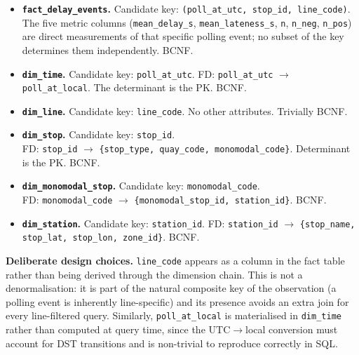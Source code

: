 \documentclass[a4paper,11pt]{article}
\begin{document}
\begin{itemize}
  \item \textbf{\texttt{fact\_delay\_events}.}
    Candidate key: \texttt{(poll\_at\_utc, stop\_id, line\_code)}.
    The five metric columns (\texttt{mean\_delay\_s}, \texttt{mean\_lateness\_s},
    \texttt{n}, \texttt{n\_neg}, \texttt{n\_pos}) are direct measurements of that
    specific polling event; no subset of the key determines them independently.
    BCNF. \\
  \item \textbf{\texttt{dim\_time}.}
    Candidate key: \texttt{poll\_at\_utc}.
    FD: \texttt{poll\_at\_utc} $\to$ \texttt{poll\_at\_local}.
    The determinant is the PK. BCNF. \\
  \item \textbf{\texttt{dim\_line}.}
    Candidate key: \texttt{line\_code}. No other attributes. Trivially BCNF. \\
  \item \textbf{\texttt{dim\_stop}.}
    Candidate key: \texttt{stop\_id}.\\
    FD: \texttt{stop\_id} $\to$ \texttt{\{stop\_type, quay\_code, monomodal\_code\}}.
    Determinant is the PK. BCNF. \\
  \item \textbf{\texttt{dim\_monomodal\_stop}.}
    Candidate key: \texttt{monomodal\_code}.\\
    FD: \texttt{monomodal\_code} $\to$ \texttt{\{monomodal\_stop\_id, station\_id\}}.
    BCNF. \\
  \item \textbf{\texttt{dim\_station}.}
    Candidate key: \texttt{station\_id}.
    FD: \texttt{station\_id} $\to$ \texttt{\{stop\_name, stop\_lat, stop\_lon,
    zone\_id\}}.
    BCNF.
\end{itemize}

\textbf{Deliberate design choices.}
\texttt{line\_code} appears as a column in the fact table rather than being
derived through the dimension chain.
This is not a denormalisation: it is part of the natural composite key of the
observation (a polling event is inherently line-specific) and its presence avoids
an extra join for every line-filtered query.
Similarly, \texttt{poll\_at\_local} is materialised in \texttt{dim\_time} rather
than computed at query time, since the UTC$\to$local conversion must account for
DST transitions and is non-trivial to reproduce correctly in SQL.


\newpage
\end{document}
